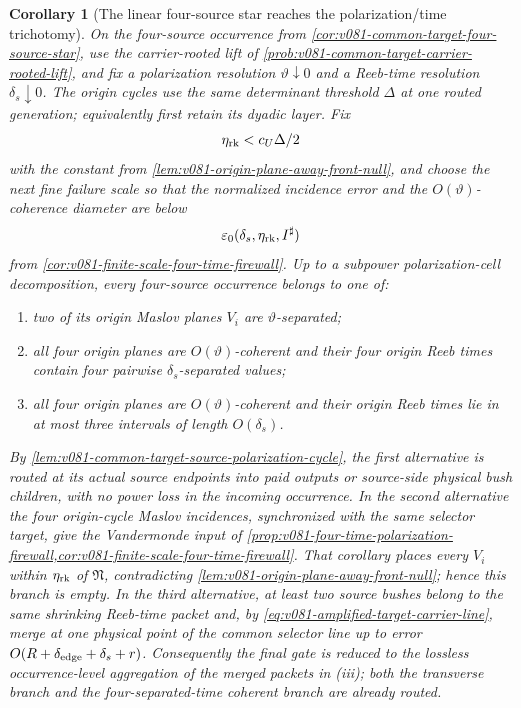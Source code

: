 \documentclass[10pt]{article}
\newtheorem{corollary}[theorem]{Corollary}
\begin{document}
\begin{corollary}[The linear four-source star reaches the polarization/time trichotomy]
\label{cor:v081-common-target-polarized-four-star}
On the four-source occurrence from
\cref{cor:v081-common-target-four-source-star}, use the carrier-rooted lift of
\cref{prob:v081-common-target-carrier-rooted-lift}, and fix a polarization resolution
\(\vartheta\downarrow0\) and a Reeb-time resolution \(\delta_s\downarrow0\).  The origin cycles use
the same determinant threshold \(\Delta\) at one routed generation; equivalently first retain its
dyadic layer.  Fix
\[
\eta_{\rm rk}<c_U\Delta/2
\]
with the constant from
\cref{lem:v081-origin-plane-away-front-null}, and choose the next fine failure scale so that the
normalized incidence error and the \(O(\vartheta)\)-coherence diameter are below
\[
\varepsilon_0(\delta_s,\eta_{\rm rk},I^\sharp)
\]
from \cref{cor:v081-finite-scale-four-time-firewall}.  Up to a subpower polarization-cell decomposition, every
four-source occurrence belongs to one of:
\begin{enumerate}[label=\textnormal{(\roman*)}]
\item two of its origin Maslov planes \(V_i\) are \(\vartheta\)-separated;
\item all four origin planes are \(O(\vartheta)\)-coherent and their four origin Reeb times contain four
pairwise \(\delta_s\)-separated values;
\item all four origin planes are \(O(\vartheta)\)-coherent and their origin Reeb times lie in at most
three intervals of length \(O(\delta_s)\).
\end{enumerate}
By \cref{lem:v081-common-target-source-polarization-cycle}, the first alternative is routed at its
actual source endpoints into paid outputs or source-side physical bush children, with no power loss
in the incoming occurrence.  In the second alternative the four origin-cycle Maslov incidences,
synchronized with the same selector target, give the Vandermonde input of
\cref{prop:v081-four-time-polarization-firewall,cor:v081-finite-scale-four-time-firewall}.  That
corollary places every \(V_i\) within \(\eta_{\rm rk}\) of \(\mathfrak N\), contradicting
\cref{lem:v081-origin-plane-away-front-null}; hence this branch is empty.  In the third
alternative, at least two source bushes
belong to the same shrinking Reeb-time packet and, by
\eqref{eq:v081-amplified-target-carrier-line}, merge at one physical point of the common selector
line up to error \(O(R+\delta_{\rm edge}+\delta_s+r)\).  Consequently the final gate is reduced to the lossless
occurrence-level aggregation of the merged packets in \textnormal{(iii)}; both the transverse
branch and the four-separated-time coherent branch are already routed.
\end{corollary}
\end{document}
